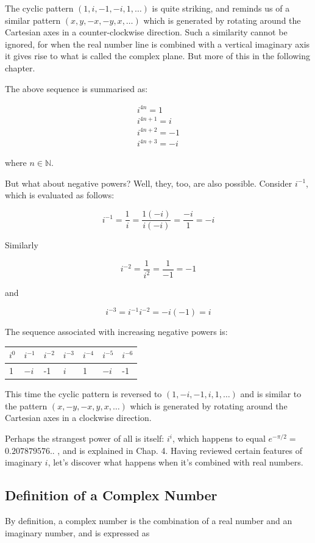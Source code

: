 \documentclass[10pt]{article}
\begin{document}
The cyclic pattern $(1, i,-1,-i, 1, \ldots)$ is quite striking, and reminds us of a similar pattern $(x, y,-x,-y, x, \ldots)$ which is generated by rotating around the Cartesian axes in a counter-clockwise direction. Such a similarity cannot be ignored, for when the real number line is combined with a vertical imaginary axis it gives rise to what is called the complex plane. But more of this in the following chapter.

The above sequence is summarised as:

$$
\begin{gathered}
i^{4 n}=1 \\
i^{4 n+1}=i \\
i^{4 n+2}=-1 \\
i^{4 n+3}=-i
\end{gathered}
$$

where $n \in \mathbb{N}$.

But what about negative powers? Well, they, too, are also possible. Consider $i^{-1}$, which is evaluated as follows:

$$
i^{-1}=\frac{1}{i}=\frac{1(-i)}{i(-i)}=\frac{-i}{1}=-i
$$

Similarly

$$
i^{-2}=\frac{1}{i^{2}}=\frac{1}{-1}=-1
$$

and

$$
i^{-3}=i^{-1} i^{-2}=-i(-1)=i
$$

The sequence associated with increasing negative powers is:

\begin{center}
\begin{tabular}{lllllll}
\hline
$i^{0}$ & $i^{-1}$ & $i^{-2}$ & $i^{-3}$ & $i^{-4}$ & $i^{-5}$ & $i^{-6}$ \\
\hline
1 & $-i$ & -1 & $i$ & 1 & $-i$ & -1 \\
\hline
\end{tabular}
\end{center}

This time the cyclic pattern is reversed to $(1,-i,-1, i, 1, \ldots)$ and is similar to the pattern $(x,-y,-x, y, x, \ldots)$ which is generated by rotating around the Cartesian axes in a clockwise direction.

Perhaps the strangest power of all is itself: $i^{i}$, which happens to equal $e^{-\pi / 2}=$ $0.207879576 .$. , and is explained in Chap. 4. Having reviewed certain features of imaginary $i$, let's discover what happens when it's combined with real numbers.

\subsection{Definition of a Complex Number}
By definition, a complex number is the combination of a real number and an imaginary number, and is expressed as
\end{document}
